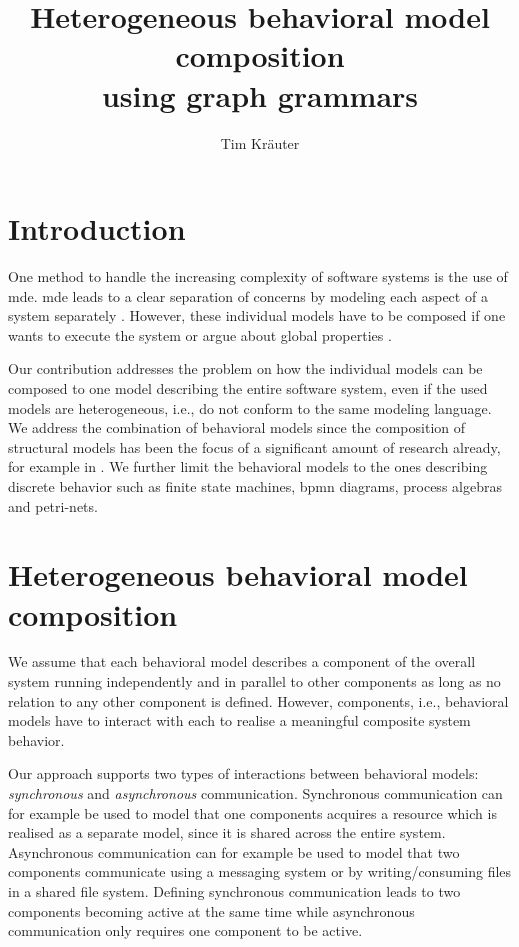 \documentclass[a4paper]{easychair}
\title{Heterogeneous behavioral model composition \\
        using graph grammars}
\author{
Tim Kräuter\inst{1}
}
\institute{
  Høgskulen på Vestlandet\\
  Bergen, Norway\\
  \email{tkra@hvl.no}
 }
\begin{document}
\maketitle

\section{Introduction}
One method to handle the increasing complexity of software systems is the use of \gls{mde}.
\gls{mde} leads to a clear separation of concerns by modeling each aspect of a system separately \cite{franceModeldrivenDevelopmentComplex2007}.
However, these individual models have to be composed if one wants to execute the system or argue about global properties \cite{kienzleUnifyingFrameworkHomogeneous2019}.

Our contribution addresses the problem on how the individual models can be composed to one model describing the entire software system, even if the used models are heterogeneous, i.e., do not conform to the same modeling language.
We address the combination of behavioral models since the composition of structural models has been the focus of a significant amount of research already, for example in \cite{kienzleUnifyingFrameworkHomogeneous2019, klareCommonalitiesPreservingConsistency2019, stunkelComprehensiveSystemsFormal2021}.
We further limit the behavioral models to the ones describing discrete behavior such as finite state machines, \gls{bpmn} diagrams, process algebras and petri-nets. %

\section{Heterogeneous behavioral model composition}
We assume that each behavioral model describes a component of the overall system running independently and in parallel to other components as long as no relation to any other component is defined.
However, components, i.e., behavioral models have to interact with each to realise a meaningful composite system behavior.

Our approach supports two types of interactions between behavioral models: \textit{synchronous} and \textit{asynchronous} communication.
Synchronous communication can for example be used to model that one components acquires a resource which is realised as a separate model, since it is shared across the entire system.
Asynchronous communication can for example be used to model that two components communicate using a messaging system or by writing/consuming files in a shared file system.
Defining synchronous communication leads to two components becoming active at the same time while asynchronous communication only requires one component to be active. 
\end{document}
